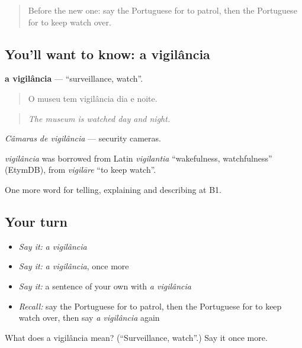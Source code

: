 \label{lesson:PT-C293-vigilancia}



\begin{quote}
Before the new one: say the Portuguese for to patrol, then the Portuguese for to keep watch over.
\end{quote}

\subsection*{You'll want to know: a vigilância}
\textbf{a vigilância} — \textquotedblleft{}surveillance, watch\textquotedblright{}.

\begin{quote}
O museu tem vigilância dia e noite.
\end{quote}

\begin{quote}
\emph{The museum is watched day and night.}
\end{quote}

\emph{Câmaras de vigilância} — security cameras.

\begin{cousinweb}
\emph{vigilância} was borrowed from Latin \emph{vigilantia} \textquotedblleft{}wakefulness, watchfulness\textquotedblright{} (EtymDB), from \emph{vigilāre} \textquotedblleft{}to keep watch\textquotedblright{}.
\end{cousinweb}

\begin{grammarlens}[title={What you've built}]
One more word for telling, explaining and describing at B1.
\end{grammarlens}

\subsection*{Your turn}
\begin{itemize}
\raggedright
  \item \emph{Say it:} \emph{a vigilância}
  \item \emph{Say it:} \emph{a vigilância}, once more
  \item \emph{Say it:} a sentence of your own with \emph{a vigilância}
  \item \emph{Recall:} say the Portuguese for to patrol, then the Portuguese for to keep watch over, then say \emph{a vigilância} again
\end{itemize}

\begin{tcolorbox}[breakable,colback=teal!4,colframe=teal!35!black,title={Before you move on}]
What does a vigilância mean? (\textquotedblleft{}Surveillance, watch\textquotedblright{}.) Say it once more.
\end{tcolorbox}
